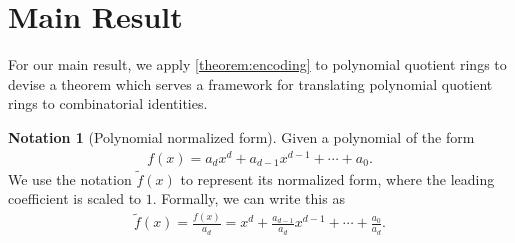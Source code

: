 \documentclass[12pt]{article}
\theoremstyle{plain}
\theoremstyle{definition}
\newtheorem{notation}{Notation}
\begin{document}
\section{Main Result} \label{section:results}
For our main result, we apply \cref{theorem:encoding} to polynomial quotient rings to devise a theorem which serves a framework for translating polynomial quotient rings to combinatorial identities.

\begin{notation}[Polynomial normalized form]
Given a polynomial of the form
\begin{align*}
f(x) = a_d x^d + a_{d-1} x^{d-1} + \cdots + a_0 .
\end{align*}
We use the notation $\tilde{f}(x)$ to represent its normalized form, where the leading coefficient is scaled to $1$. Formally, we can write this as
\begin{align*}
    \tilde{f}(x) = \frac{f(x)}{a_d} = x^d + \frac{a_{d-1}}{a_d} x^{d-1} + \cdots + \frac{a_0}{a_d} .
\end{align*}
\end{notation}
\end{document}
